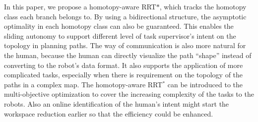 \documentclass[letterpaper, 10 pt, conference]{ieeeconf}
\begin{document}
In this paper, we propose a homotopy-aware RRT$*$, which tracks the homotopy class each branch belongs to.
By using a bidirectional structure, the asymptotic optimality in each homotopy class can also be guaranteed.
This enables the sliding autonomy to support different level of task supervisor's intent on the topology in planning paths.
The way of communication is also more natural for the human, because the human can directly visualize the path ``shape'' instead of converting to the robot's data format.
It also supports the application of more complicated tasks, especially when there is requirement on the topology of the paths in a complex map.
The homotopy-aware RRT$^{*}$ can be introduced to the multi-objective optimization to cover the increasing complexity of the tasks to the robots.
Also an online identification of the human's intent might start the workspace reduction earlier so that the efficiency could be enhanced.



\end{document}
